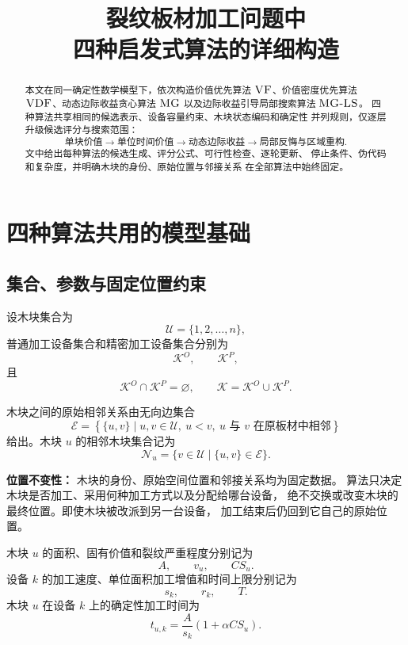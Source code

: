 \documentclass[UTF8,12pt,a4paper]{ctexart}
\title{\textbf{裂纹板材加工问题中\\四种启发式算法的详细构造}}
\author{}
\date{}
\newcommand{\Alg}[1]{\textsc{#1}}
\newcommand{\U}{\mathcal{U}}
\newcommand{\K}{\mathcal{K}}
\newcommand{\KO}{\mathcal{K}^{O}}
\newcommand{\KP}{\mathcal{K}^{P}}
\newcommand{\E}{\mathcal{E}}
\newcommand{\N}{\mathcal{N}}
\begin{document}
\maketitle

\begin{abstract}
本文在同一确定性数学模型下，依次构造价值优先算法
\(\Alg{VF}\)、价值密度优先算法 \(\Alg{VDF}\)、动态边际收益贪心算法
\(\Alg{MG}\) 以及边际收益引导局部搜索算法
\(\Alg{MG-LS}\)。
四种算法共享相同的候选表示、设备容量约束、木块状态编码和确定性
并列规则，仅逐层升级候选评分与搜索范围：
\[
\boxed{
\text{单块价值}
\longrightarrow
\text{单位时间价值}
\longrightarrow
\text{动态边际收益}
\longrightarrow
\text{局部反悔与区域重构}
}.
\]
文中给出每种算法的候选生成、评分公式、可行性检查、逐轮更新、
停止条件、伪代码和复杂度，并明确木块的身份、原始位置与邻接关系
在全部算法中始终固定。
\end{abstract}

\tableofcontents
\newpage

\section{四种算法共用的模型基础}

\subsection{集合、参数与固定位置约束}

设木块集合为
\[
\U=\{1,2,\ldots,n\},
\]
普通加工设备集合和精密加工设备集合分别为
\[
\KO,\qquad \KP,
\]
且
\[
\KO\cap\KP=\varnothing,
\qquad
\K=\KO\cup\KP.
\]

木块之间的原始相邻关系由无向边集合
\[
\E=\left\{\{u,v\}\mid u,v\in\U,\ u<v,\ u\text{ 与 }v\text{ 在原板材中相邻}\right\}
\]
给出。木块 \(u\) 的相邻木块集合记为
\[
\N_u=\{v\in\U\mid \{u,v\}\in\E\}.
\]

\begin{keybox}
\textbf{位置不变性：}
木块的身份、原始空间位置和邻接关系均为固定数据。
算法只决定木块是否加工、采用何种加工方式以及分配给哪台设备，
绝不交换或改变木块的最终位置。即使木块被改派到另一台设备，
加工结束后仍回到它自己的原始位置。
\end{keybox}

木块 \(u\) 的面积、固有价值和裂纹严重程度分别记为
\[
A,\qquad v_u,\qquad CS_u.
\]
设备 \(k\) 的加工速度、单位面积加工增值和时间上限分别记为
\[
s_k,\qquad r_k,\qquad T.
\]
木块 \(u\) 在设备 \(k\) 上的确定性加工时间为
\[
\boxed{
t_{u,k}
=
\frac{A}{s_k}\left(1+\alpha CS_u\right)
}.
\]
\end{document}
